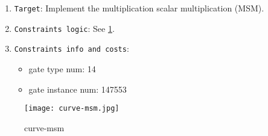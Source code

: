 
\begin{enumerate}
    \item \verb|Target|: Implement the multiplication scalar multiplication (MSM).
    \item \verb|Constraints logic|: See \ref{fig:curve-msm}.
    \item \verb|Constraints info and costs|:
    \begin{itemize}
        \item gate type num: 14
        \item gate instance num: 147553
    \end{itemize}
\end{enumerate}

\begin{figure}[!ht]
    \centering
    \texttt{[image: curve-msm.jpg]}
    \caption{curve-msm}
    \label{fig:curve-msm}
\end{figure}
